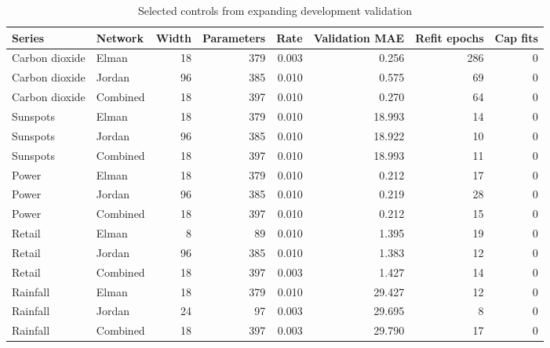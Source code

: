 \begin{table}[t]
\caption{Selected controls from expanding development validation}
\label{tab:selection}
\centering\small
\begin{tabular}{llrrrrrr}
\toprule
Series & Network & Width & Parameters & Rate & Validation MAE & Refit epochs & Cap fits \\
\midrule
Carbon dioxide & Elman & 18 & 379 & 0.003 & 0.256 & 286 & 0 \\
Carbon dioxide & Jordan & 96 & 385 & 0.010 & 0.575 & 69 & 0 \\
Carbon dioxide & Combined & 18 & 397 & 0.010 & 0.270 & 64 & 0 \\
Sunspots & Elman & 18 & 379 & 0.010 & 18.993 & 14 & 0 \\
Sunspots & Jordan & 96 & 385 & 0.010 & 18.922 & 10 & 0 \\
Sunspots & Combined & 18 & 397 & 0.010 & 18.993 & 11 & 0 \\
Power & Elman & 18 & 379 & 0.010 & 0.212 & 17 & 0 \\
Power & Jordan & 96 & 385 & 0.010 & 0.219 & 28 & 0 \\
Power & Combined & 18 & 397 & 0.010 & 0.212 & 15 & 0 \\
Retail & Elman & 8 & 89 & 0.010 & 1.395 & 19 & 0 \\
Retail & Jordan & 96 & 385 & 0.010 & 1.383 & 12 & 0 \\
Retail & Combined & 18 & 397 & 0.003 & 1.427 & 14 & 0 \\
Rainfall & Elman & 18 & 379 & 0.010 & 29.427 & 12 & 0 \\
Rainfall & Jordan & 24 & 97 & 0.003 & 29.695 & 8 & 0 \\
Rainfall & Combined & 18 & 397 & 0.003 & 29.790 & 17 & 0 \\
\bottomrule
\end{tabular}
\end{table}
